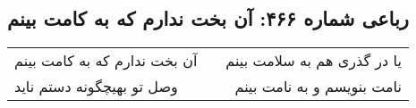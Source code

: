 \begin{center}
\section*{رباعی شماره ۴۶۶: آن بخت ندارم که به کامت بینم}
\label{sec:sh466}
\begin{longtable}{l p{0.5cm} r}
آن بخت ندارم که به کامت بینم
&&
یا در گذری هم به سلامت بینم
\\
وصل تو بهیچگونه دستم ناید
&&
نامت بنویسم و به نامت بینم
\\
\end{longtable}
\end{center}
